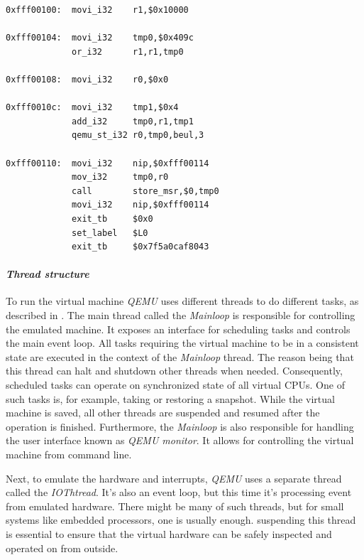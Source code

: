\begin{minipage}{\linewidth}
\begin{lstlisting}[caption={QEMU TCG intermediate assembly code from \cite{qemutcgir}},label={lst:tcgir}]
0xfff00100:  movi_i32    r1,$0x10000

0xfff00104:  movi_i32    tmp0,$0x409c
             or_i32      r1,r1,tmp0

0xfff00108:  movi_i32    r0,$0x0

0xfff0010c:  movi_i32    tmp1,$0x4
             add_i32     tmp0,r1,tmp1
             qemu_st_i32 r0,tmp0,beul,3

0xfff00110:  movi_i32    nip,$0xfff00114
             mov_i32     tmp0,r0
             call        store_msr,$0,tmp0
             movi_i32    nip,$0xfff00114
             exit_tb     $0x0
             set_label   $L0
             exit_tb     $0x7f5a0caf8043
\end{lstlisting}
\end{minipage}

\paragraph{\textit{Thread structure}}
To run the virtual machine \textit{QEMU} uses different threads to do different tasks, as described in \cite{qemuthreads}. The main thread called the \textit{Mainloop} is responsible for controlling the emulated machine. It exposes an interface for scheduling tasks and controls the main event loop. All tasks requiring the virtual machine to be in a consistent state are executed in the context of the \textit{Mainloop} thread. The reason being that this thread can halt and shutdown other threads when needed. Consequently, scheduled tasks can operate on synchronized state of all virtual CPUs. One of such tasks is, for example, taking or restoring a snapshot. While the virtual machine is saved, all other threads are suspended and resumed after the operation is finished. Furthermore, the \textit{Mainloop} is also responsible for handling the user interface known as \textit{QEMU monitor}. It allows for controlling the virtual machine from command line.

Next, to emulate the hardware and interrupts, \textit{QEMU} uses a separate thread called the \textit{IOThtread}. It's also an event loop, but this time it's processing event from emulated hardware. There might be many of such threads, but for small systems like embedded processors, one is usually enough. suspending this thread is essential to ensure that the virtual hardware can be safely inspected and operated on from outside.

